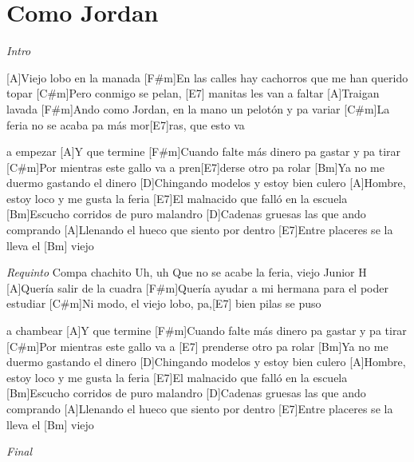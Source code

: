 \section{Como Jordan}

\noindent
\vspace{1cm}

\begin{guitar}
	\begin{multicols}{2}

		\textit{Intro}

		[A]Viejo lobo en la manada
		[F#m]En las calles hay cachorros que me han querido topar
		[C#m]Pero conmigo se pelan, [E7] manitas les van a faltar
		[A]Traigan lavada
		[F#m]Ando como Jordan, en la mano un pelotón y pa variar
		[C#m]La feria no se acaba pa más mor[E7]ras, que esto va \par a empezar
		[A]Y que termine
		[F#m]Cuando falte más dinero pa gastar y pa tirar
		[C#m]Por mientras este gallo va a pren[E7]derse otro pa rolar
		[Bm]Ya no me duermo gastando el dinero
		[D]Chingando modelos y estoy bien culero
		[A]Hombre, estoy loco y me gusta la feria
		[E7]El malnacido que falló en la escuela
		[Bm]Escucho corridos de puro malandro
		[D]Cadenas gruesas las que ando comprando
		[A]Llenando el hueco que siento por dentro
		[E7]Entre placeres se la lleva el [Bm] viejo

		\textit{Requinto}
		Compa chachito
		Uh, uh
		Que no se acabe la feria, viejo
		Junior H
		[A]Quería salir de la cuadra
		[F#m]Quería ayudar a mi hermana para el poder estudiar
		[C#m]Ni modo, el viejo lobo, pa,[E7] bien pilas se puso \par a chambear
		[A]Y que termine
		[F#m]Cuando falte más dinero pa gastar y pa tirar
		[C#m]Por mientras este gallo va a [E7] prenderse otro pa rolar
		[Bm]Ya no me duermo gastando el dinero
		[D]Chingando modelos y estoy bien culero
		[A]Hombre, estoy loco y me gusta la feria
		[E7]El malnacido que falló en la escuela
		[Bm]Escucho corridos de puro malandro
		[D]Cadenas gruesas las que ando comprando
		[A]Llenando el hueco que siento por dentro
		[E7]Entre placeres se la lleva el [Bm] viejo

		\textit{Final}

	\end{multicols}
\end{guitar}
